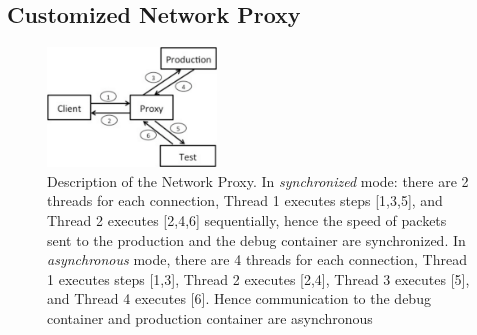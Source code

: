 \subsection{Customized Network Proxy} 
\label{sec:proxyDuplicator}

\begin{figure}[t]
  \begin{center}
    \includegraphics[width=0.4\textwidth]{figs/network_dup.eps}
    \caption{Description of the Network Proxy. In \textit{synchronized} mode: there are 2 threads for each connection, Thread 1 executes steps [1,3,5], and Thread 2 executes [2,4,6] sequentially, hence the speed of packets sent to the production and the debug container are synchronized. In \textit{asynchronous} mode, there are 4 threads for each connection, Thread 1 executes steps [1,3], Thread 2 executes [2,4], Thread 3 executes [5], and Thread 4 executes [6]. Hence communication to the debug container and production container are asynchronous}
    \label{fig:duplicator}
  \end{center}
\end{figure}

